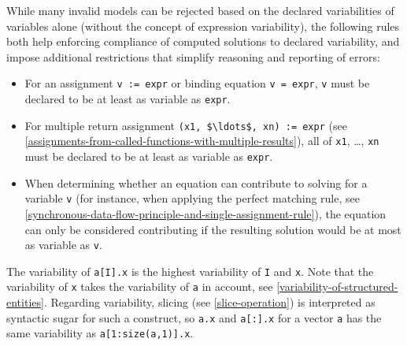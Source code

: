While many invalid models can be rejected based on the declared variabilities of variables alone (without the concept of expression variability), the following rules both help enforcing compliance of computed solutions to declared variability, and impose additional restrictions that simplify reasoning and reporting of errors:
\begin{itemize}
\item
  For an assignment \lstinline!v := expr! or binding equation \lstinline!v = expr!, \lstinline!v! must be declared to be at least as variable as \lstinline!expr!.
\item
  For multiple return assignment \lstinline!(x1, $\ldots$, xn) := expr! (see \cref{assignments-from-called-functions-with-multiple-results}), all of \lstinline!x1!, \ldots, \lstinline!xn! must be declared to be at least as variable as \lstinline!expr!.
\item
  When determining whether an equation can contribute to solving for a variable \lstinline!v! (for instance, when applying the perfect matching rule, see \cref{synchronous-data-flow-principle-and-single-assignment-rule}), the equation can only be considered contributing if the resulting solution would be at most as variable as \lstinline!v!.
\end{itemize}

The variability of \lstinline!a[I].x! is the highest variability of \lstinline!I! and \lstinline!x!.
Note that the variability of \lstinline!x! takes the variability of \lstinline!a! in account, see \cref{variability-of-structured-entities}.
Regarding variability, slicing (see \cref{slice-operation}) is interpreted as syntactic sugar for such a construct, so \lstinline!a.x! and \lstinline!a[:].x! for a vector \lstinline!a! has the same variability as \lstinline!a[1:size(a,1)].x!.

